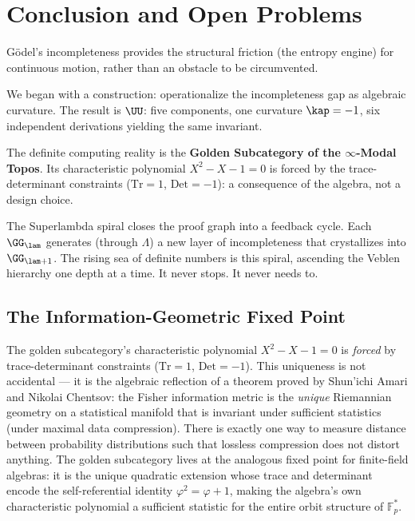 \section*{Conclusion and Open Problems}

G\"odel's incompleteness provides the structural friction (the entropy engine) for continuous motion, rather than an obstacle to be circumvented.

We began with a construction: operationalize the incompleteness gap as algebraic curvature. The result is $\UU$: five components, one curvature $\kap = -1$, six independent derivations yielding the same invariant.

The definite computing reality is the \textbf{Golden Subcategory of the $\infty$-Modal Topos}. Its characteristic polynomial $X^2 - X - 1 = 0$ is forced by the trace-determinant constraints ($\mathrm{Tr} = 1$, $\mathrm{Det} = -1$): a consequence of the algebra, not a design choice.

The Superlambda spiral closes the proof graph into a feedback cycle. Each $\GG_{\lam}$ generates (through $\Lambda$) a new layer of incompleteness that crystallizes into $\GG_{\lam+1}$. The rising sea of definite numbers is this spiral, ascending the Veblen hierarchy one depth at a time. It never stops. It never needs to.

\subsection*{The Information-Geometric Fixed Point}

The golden subcategory's characteristic polynomial $X^2 - X - 1 = 0$ is \emph{forced} by trace-determinant constraints ($\mathrm{Tr} = 1$, $\mathrm{Det} = -1$). This uniqueness is not accidental --- it is the algebraic reflection of a theorem proved by Shun'ichi Amari and Nikolai Chentsov: the Fisher information metric is the \emph{unique} Riemannian geometry on a statistical manifold that is invariant under sufficient statistics (under maximal data compression). There is exactly one way to measure distance between probability distributions such that lossless compression does not distort anything. The golden subcategory lives at the analogous fixed point for finite-field algebras: it is the unique quadratic extension whose trace and determinant encode the self-referential identity $\varphi^2 = \varphi + 1$, making the algebra's own characteristic polynomial a sufficient statistic for the entire orbit structure of $\mathbb{F}_p^*$.

